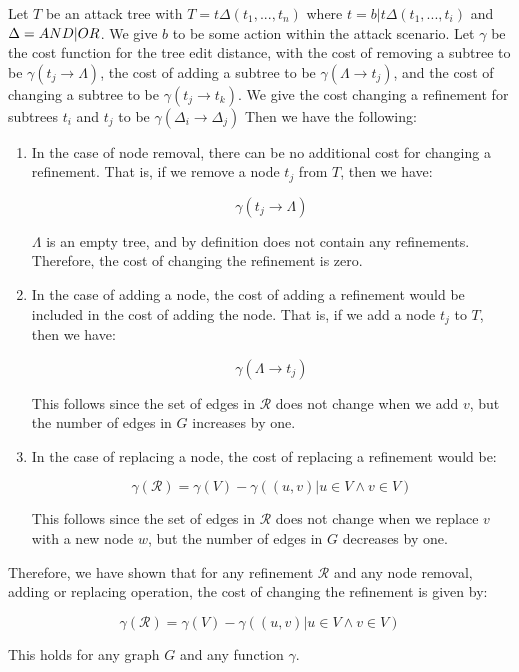 \begin{lemma} \label{lem:refinement_change_cost} Let $T$ be an attack tree with $T = t\Delta(t_1,...,t_n)$ where $t = b|t\Delta(t_1,...,t_i)$ and $\Delta = AND|OR$. We give $b$ to be some action within the attack scenario. Let $\gamma$ be the cost function for the tree edit distance, with the cost of removing a subtree to be $\gamma(t_j \rightarrow {\Lambda})$, the cost of adding a subtree to be $\gamma({\Lambda}\rightarrow t_j)$, and the cost of changing a subtree to be $\gamma(t_j \rightarrow t_k)$. We give the cost changing a refinement for subtrees $t_i$ and $t_j$ to be $\gamma(\Delta_i \rightarrow \Delta_j)$ Then we have the following:

\begin{enumerate} \item In the case of node removal, there can be no additional cost for changing a refinement. That is, if we remove a node $t_j$ from $T$, then we have:

$$\gamma(t_j \rightarrow {\Lambda})$$

$\Lambda$ is an empty tree, and by definition does not contain any refinements. Therefore, the cost of changing the refinement is zero.

\item In the case of adding a node, the cost of adding a refinement would be included in the cost of adding the node. That is, if we add a node $t_j$ to $T$, then we have:

$$\gamma(\Lambda \rightarrow {t_j})$$


              This follows since the set of edges in $\mathcal{R}$ does not change when we add $v$, but the number of edges in $G$ increases by one.

        \item In the case of replacing a node, the cost of replacing a refinement would be:

              $$\gamma(\mathcal{R}) = \gamma(V) - \gamma({(u, v) | u \in V \land v \in V})$$

              This follows since the set of edges in $\mathcal{R}$ does not change when we replace $v$ with a new node $w$, but the number of edges in $G$ decreases by one. \end{enumerate}

    Therefore, we have shown that for any refinement $\mathcal{R}$ and any node removal, adding or replacing operation, the cost of changing the refinement is given by:

    $$\gamma(\mathcal{R}) = \gamma(V) - \gamma({(u, v) | u \in V \land v \in V})$$

    This holds for any graph $G$ and any function $\gamma$.

\end{lemma}

